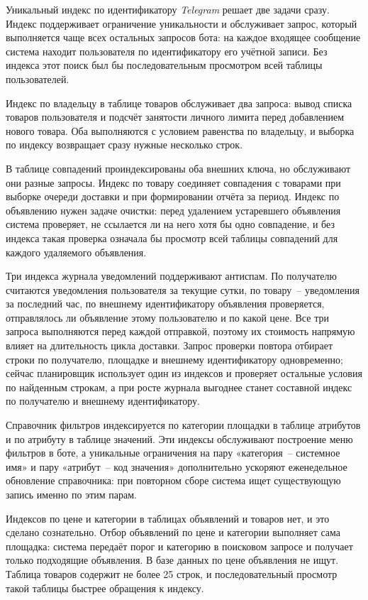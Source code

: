 Уникальный индекс по идентификатору \textit{Telegram} решает две задачи сразу. Индекс поддерживает ограничение уникальности и обслуживает запрос, который выполняется чаще всех остальных запросов бота: на каждое входящее сообщение система находит пользователя по идентификатору его учётной записи. Без индекса этот поиск был бы последовательным просмотром всей таблицы пользователей.

Индекс по владельцу в таблице товаров обслуживает два запроса: вывод списка товаров пользователя и подсчёт занятости личного лимита перед добавлением нового товара. Оба выполняются с условием равенства по владельцу, и выборка по индексу возвращает сразу нужные несколько строк.

В таблице совпадений проиндексированы оба внешних ключа, но обслуживают они разные запросы. Индекс по товару соединяет совпадения с товарами при выборке очереди доставки и при формировании отчёта за период. Индекс по объявлению нужен задаче очистки: перед удалением устаревшего объявления система проверяет, не ссылается ли на него хотя бы одно совпадение, и без индекса такая проверка означала бы просмотр всей таблицы совпадений для каждого удаляемого объявления.

Три индекса журнала уведомлений поддерживают антиспам. По получателю считаются уведомления пользователя за текущие сутки, по товару~-- уведомления за последний час, по внешнему идентификатору объявления проверяется, отправлялось ли объявление этому пользователю и по какой цене. Все три запроса выполняются перед каждой отправкой, поэтому их стоимость напрямую влияет на длительность цикла доставки. Запрос проверки повтора отбирает строки по получателю, площадке и внешнему идентификатору одновременно; сейчас планировщик использует один из индексов и проверяет остальные условия по найденным строкам, а при росте журнала выгоднее станет составной индекс по получателю и внешнему идентификатору.

Справочник фильтров индексируется по категории площадки в таблице атрибутов и по атрибуту в таблице значений. Эти индексы обслуживают построение меню фильтров в боте, а уникальные ограничения на пару «категория~-- системное имя» и пару «атрибут~-- код значения» дополнительно ускоряют еженедельное обновление справочника: при повторном сборе система ищет существующую запись именно по этим парам.

Индексов по цене и категории в таблицах объявлений и товаров нет, и это сделано сознательно. Отбор объявлений по цене и категории выполняет сама площадка: система передаёт порог и категорию в поисковом запросе и получает только подходящие объявления. В базе данных по цене объявления не ищут. Таблица товаров содержит не более 25 строк, и последовательный просмотр такой таблицы быстрее обращения к индексу.

